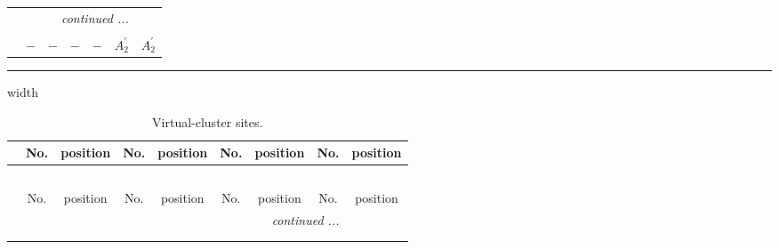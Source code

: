 \documentclass[fleqn,10pt,landscape]{article}
\begin{document}
\begin{itemize}
\begin{center}
\begin{longtable}{ccccccc}
 \hline \hline
\multicolumn{6}{r}{\footnotesize\it continued ...} \\ \endfoot

 \hline \hline
\multicolumn{6}{r}{} \\ \endlastfoot

$  $ & $ - $ & $ - $ & $ - $ & $ - $ & $ A_{2}^{\prime} $ & $ A_{2}^{\prime} $ \\
\end{longtable}
\end{center}

 \hfil \hrule height 1mm width \textwidth \hfil

{
\scriptsize
\begin{center}
\renewcommand{\arraystretch}{1.7}
\begin{longtable}{ccccccccc}
\caption{Virtual-cluster sites.}
 \\
 \hline \hline
 & No. & position & No. & position & No. & position & No. & position \\ \hline \endfirsthead

\multicolumn{8}{l}{\tablename\ \thetable{}} \\
 \hline \hline
 & No. & position & No. & position & No. & position & No. & position \\ \hline \endhead

 \hline \hline
\multicolumn{8}{r}{\footnotesize\it continued ...} \\ \endfoot

 \hline \hline
\multicolumn{8}{r}{} \\ \endlastfoot


\end{longtable}
\end{center}}
\end{itemize}
\end{document}

